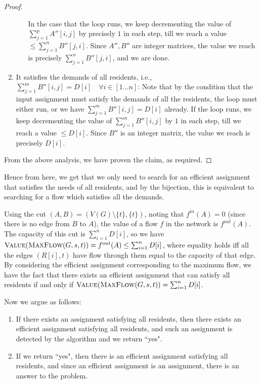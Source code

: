 \documentclass[answers]{exam}
\begin{document}
\begin{questions}
\begin{solution}
\begin{proof}
\begin{enumerate}
\begin{enumerate}
                In the case that the loop runs, we keep decrementing the value of $\sum_{j = 1}^p A''[i, j]$ by precisely $1$ in each step, till we reach a value $\le \sum_{j = 1}^n B''[j, i]$. Since $A'', B''$ are integer matrices, the value we reach is precisely $\sum_{j = 1}^n B''[j, i]$, and we are done.
        \end{enumerate}
    \item It satisfies the demands of all residents, i.e., $\sum_{j = 1}^m B''[i, j] = D[i] \quad \forall i \in [1\ldots n]$:
    Note that by the condition that the input assignment must satisfy the demands of all the residents, the loop must either run, or we have $\sum_{j = 1}^m B''[i, j] = D[i]$ already. If the loop runs, we keep decrementing the value of $\sum_{j = 1}^m B''[i, j]$ by $1$ in each step, till we reach a value $\le D[i]$. Since $B''$ is an integer matrix, the value we reach is precisely $D[i]$.
\end{enumerate}
From the above analysis, we have proven the claim, as required.
\end{proof}

Hence from here, we get that we only need to search for an efficient assignment that satisfies the needs of all residents, and by the bijection, this is equivalent to searching for a flow which satisfies all the demands.

Using the cut $(A, B) = (V(G) \setminus \{t\}, \{t\})$, noting that $f^{in}(A) = 0$ (since there is no edge from $B$ to $A$), the value of a flow $f$ in the network is $f^{out}(A)$. The capacity of this cut is $\sum_{i = 1}^n D[i]$, so we have $\textsc{Value}(\textsc{MaxFlow}(G, s, t)) = f^{out}(A) \le \sum_{i = 1}^n D[i]$, where equality holds iff all the edges $(R[i], t)$ have flow through them equal to the capacity of that edge. By considering the efficient assignment corresponding to the maximum flow, we have the fact that there exists an efficient assignment that can satisfy all residents if and only if $\textsc{Value}(\textsc{MaxFlow}(G, s, t)) = \sum_{i = 1}^n D[i]$.

Now we argue as follows:
\begin{enumerate}
    \item If there exists an assignment satisfying all residents, then there exists an efficient assignment satisfying all residents, and such an assignment is detected by the algorithm and we return ``yes".
    \item If we return ``yes", then there is an efficient assignment satisfying all residents, and since an efficient assignment is an assignment, there is an answer to the problem.
\end{enumerate}


\end{solution}
\end{questions}
\end{document}
